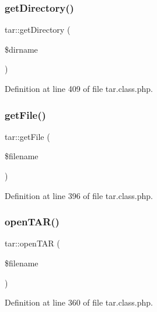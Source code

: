 \mbox{\label{classtar_a02157ed6604bec5f931ad08d1c5c048f}} 
\subsubsection{\texorpdfstring{get\+Directory()}{getDirectory()}}
{\footnotesize\ttfamily tar\+::get\+Directory (\begin{DoxyParamCaption}\item[{}]{\$dirname }\end{DoxyParamCaption})}



Definition at line 409 of file tar.\+class.\+php.

\mbox{\label{classtar_a8eb93e97f657daf1a3671c60f7093745}} 
\subsubsection{\texorpdfstring{get\+File()}{getFile()}}
{\footnotesize\ttfamily tar\+::get\+File (\begin{DoxyParamCaption}\item[{}]{\$filename }\end{DoxyParamCaption})}



Definition at line 396 of file tar.\+class.\+php.

\mbox{\label{classtar_a62fc429d1e33de90d1ce65c3c16a4193}} 
\subsubsection{\texorpdfstring{open\+T\+A\+R()}{openTAR()}}
{\footnotesize\ttfamily tar\+::open\+T\+AR (\begin{DoxyParamCaption}\item[{}]{\$filename }\end{DoxyParamCaption})}



Definition at line 360 of file tar.\+class.\+php.

\mbox{\label{classtar_a17971edb42a8be66b554ca5d6cf6bc1e}} 
